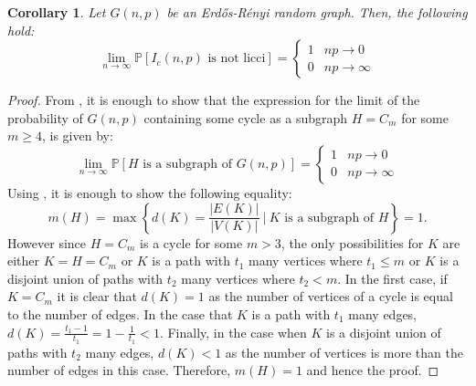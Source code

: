 \documentclass[oneside, 12pt]{amsart} \topmargin      -10mm \textwidth      160 true mm
\newtheorem{cor}[theorem]{Corollary}
\theoremstyle{definition}
\numberwithin{equation}{section}
\begin{document}
\begin{cor}\label{prob corollary}
 Let $G(n,p)$ be an Erd\H{o}s-Rényi random graph. Then, the following hold:
   $$\displaystyle\lim_{{n \rightarrow \infty}}\mathbb{P}[I_c(n,p) \text{ is not licci}]= \begin{cases} 
      1 & np \rightarrow 0 \\
      0 & np \rightarrow \infty 
   \end{cases}
$$ 
\end{cor}
\begin{proof}
From , it is enough to show that the expression for the limit of the probability of $G(n,p)$ containing some cycle as a subgraph $H=C_m$ for some $m \geq 4$, is given by:
$$\displaystyle \lim_{{n \rightarrow \infty}}\mathbb{P}[H \text{ is a subgraph of }G(n,p) ]= \begin{cases} 
      1 & np \rightarrow 0 \\
      0 & np \rightarrow \infty 
   \end{cases}$$
Using , it is enough to show the following equality:
$$m(H)=\max\left\{d(K)=\frac{|E(K)|}{|V(K)|} \ | \ K \text{ is a subgraph of $H$} \right\}=1.$$
However since $H=C_m$ is a cycle for some $m > 3$, the only possibilities for $K$ are either $K=H=C_m$ or $K$ is a path with $t_1$ many vertices where $t_1 \leq m$ or $K$ is a disjoint union    of paths with $t_2$ many vertices where $t_2 < m$. In the first case, if $K=C_m$ it is clear that $d(K)=1$ as the number of vertices of a cycle is equal to the number of edges. In the case that $K$ is a path with $t_1$ many edges, $d(K)=\frac{t_1-1}{t_1}=1-\frac{1}{t_1}<1$. Finally, in the case when $K$ is a disjoint union of paths with $t_2$ many edges, $d(K)<1$ as the number of vertices is more than the number of edges in this case. Therefore, $m(H)=1$ and hence the proof.    
\end{proof}
\end{document}
